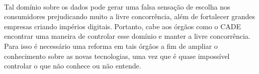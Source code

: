 \documentclass{article}
\begin{document}
	\paragraph{}
		Tal domínio sobre os dados pode gerar uma falsa sensação de escolha nos
		consumidores prejudicando muito a livre concorrência, além de fortalecer
		grandes empresas criando impérios digitais. Portanto, cabe aos órgãos como
		o CADE encontrar uma maneira de controlar esse domínio e manter a livre
		concorrência. Para isso é necessário uma reforma em tais órgãos a fim de
		ampliar o conhecimento sobre as novas tecnologias, uma vez que é quase 
		impossível controlar o que não conhece ou não entende.
\end{document}

